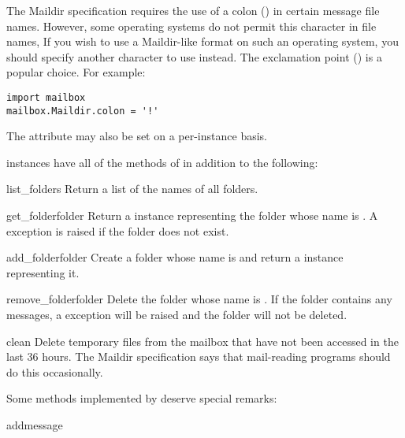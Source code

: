 \begin{notice}
The Maildir specification requires the use of a colon (\character{:}) in
certain message file names. However, some operating systems do not permit this
character in file names, If you wish to use a Maildir-like format on such an
operating system, you should specify another character to use instead. The
exclamation point (\character{!}) is a popular choice. For example:
\begin{verbatim}
import mailbox
mailbox.Maildir.colon = '!'
\end{verbatim}
The  attribute may also be set on a per-instance basis.
\end{notice}

 instances have all of the methods of  in
addition to the following:

\begin{methoddesc}{list_folders}{}
Return a list of the names of all folders.
\end{methoddesc}

\begin{methoddesc}{get_folder}{folder}
Return a  instance representing the folder whose name is
. A  exception is raised if the
folder does not exist.
\end{methoddesc}

\begin{methoddesc}{add_folder}{folder}
Create a folder whose name is  and return a 
instance representing it.
\end{methoddesc}

\begin{methoddesc}{remove_folder}{folder}
Delete the folder whose name is . If the folder contains any
messages, a  exception will be raised and the folder
will not be deleted.
\end{methoddesc}

\begin{methoddesc}{clean}{}
Delete temporary files from the mailbox that have not been accessed in the
last 36 hours. The Maildir specification says that mail-reading programs
should do this occasionally.
\end{methoddesc}

Some  methods implemented by  deserve special
remarks:

\begin{methoddesc}{add}{message}
\end{methoddesc}

